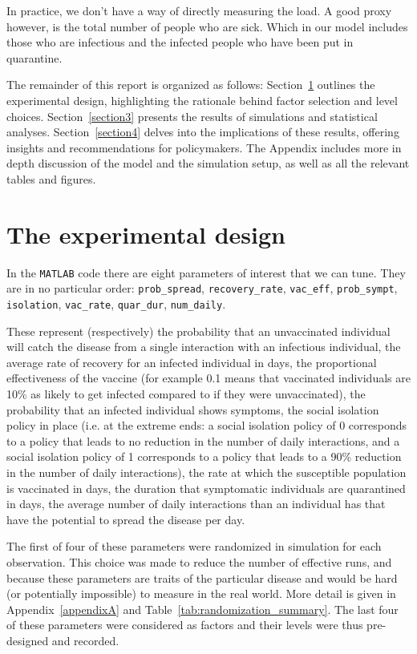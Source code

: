 \documentclass[12pt,a4paper]{article}
\begin{document}
In practice, we don't have a way of directly measuring the load. A good proxy however, is the total number of people who are sick. Which in our model includes those who are infectious and the infected people who have been put in quarantine.

The remainder of this report is organized as follows: Section~\ref{section2} outlines the experimental design, highlighting the rationale behind factor selection and level choices. Section~\ref{section3} presents the results of simulations and statistical analyses. Section~\ref{section4} delves into the implications of these results, offering insights and  recommendations for policymakers. The Appendix includes more in depth discussion of the model and the simulation setup, as well as all the relevant tables and figures.

\section{The experimental design}\label{section2}

In the \verb`MATLAB` code there are eight parameters of interest that we can tune. They are in no particular order:  \verb`prob_spread`, \verb`recovery_rate`, \verb`vac_eff`, \verb`prob_sympt`,  \verb`isolation`,  \verb`vac_rate`, \verb`quar_dur`, \verb`num_daily`.

These represent (respectively) the probability that an unvaccinated individual will catch the disease from a single interaction with an infectious individual, the average rate of recovery for an infected individual in days, the proportional effectiveness of the vaccine (for example 0.1 means that vaccinated individuals are 10\% as likely to get infected compared to if they were unvaccinated), the probability that an infected individual shows symptoms, the social isolation policy in place (i.e. at the extreme ends: a social isolation policy of 0 corresponds to a policy that leads to no reduction in the number of daily interactions, and a social isolation policy of 1 corresponds to a policy that leads to a 90\% reduction in the number of daily interactions), the rate at which the susceptible population is vaccinated in days, the duration that symptomatic individuals are quarantined in days, the average number of daily interactions than an individual has that have the potential to spread the disease per day. 

The first of four of these parameters were randomized in simulation for each observation. This choice was made to reduce the number of effective runs, and because these parameters are traits of the particular disease and would be hard (or potentially impossible) to measure in the real world. More detail is given in Appendix~\ref{appendixA} and Table~\ref{tab:randomization_summary}. The last four of these parameters were considered as factors and their levels were thus pre-designed and recorded. 
\end{document}
